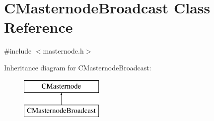 \hypertarget{class_c_masternode_broadcast}{}\section{C\+Masternode\+Broadcast Class Reference}
\label{class_c_masternode_broadcast}


{\ttfamily \#include $<$masternode.\+h$>$}

Inheritance diagram for C\+Masternode\+Broadcast\+:\begin{figure}[H]
\begin{center}
\leavevmode
\includegraphics[height=2.000000cm]{class_c_masternode_broadcast}
\end{center}
\end{figure}
